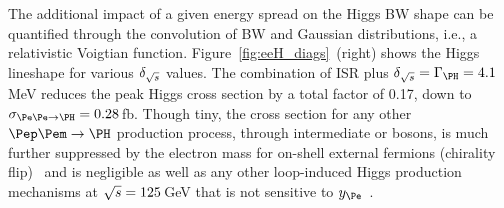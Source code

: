 The additional impact of a given energy spread on the Higgs BW shape can be quantified through the convolution of BW and Gaussian distributions, i.e., a relativistic Voigtian function. 
Figure~\ref{fig:eeH_diags}~(right) shows the Higgs lineshape for various $\delta_{\sqrt{s}}$ values. 
The combination of ISR plus $\delta_{\sqrts} = \Gamma_{\PH} = 4.1$\,MeV reduces the peak Higgs cross section by a total factor of 0.17, 
down to $\sigma_{\Pe\Pe \to \PH} = 0.28$\,fb. 
Though tiny, the cross section for any other $\Pep\Pem \to \PH$ production process, through intermediate \PW or \PZ bosons, 
is much further suppressed by the electron mass for on-shell external fermions (chirality flip)~\cite{Altmannshofer:2015qra} 
and is negligible as well as any other loop-induced Higgs production mechanisms at $\sqrt{s} = 125$\,GeV 
that is not sensitive to $y_{\Pe}$~\cite{DdE_Dung2025}.

